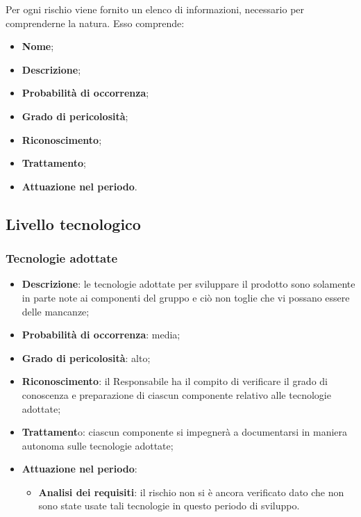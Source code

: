Per ogni rischio viene fornito un elenco di informazioni, necessario per comprenderne la natura. Esso comprende:
\begin{itemize}
	\item \textbf{Nome};
	\item \textbf{Descrizione};
	\item \textbf{Probabilità di occorrenza};
	\item \textbf{Grado di pericolosità};
	\item \textbf{Riconoscimento};
	\item \textbf{Trattamento};
	\item \textbf{Attuazione nel periodo}.
\end{itemize}
	\subsection{Livello tecnologico}
		\subsubsection{Tecnologie adottate}
		\begin{itemize}
			\item \textbf{Descrizione}: le tecnologie adottate per sviluppare il prodotto sono solamente in parte note ai componenti del gruppo e ciò non toglie che vi possano essere delle mancanze;
			\item \textbf{Probabilità di occorrenza}: media;
			\item \textbf{Grado di pericolosità}: alto;
			\item \textbf{Riconoscimento}: il Responsabile ha il compito di verificare il grado di conoscenza e preparazione di ciascun componente relativo alle tecnologie adottate;
			\item \textbf{Trattament}o: ciascun componente si impegnerà a documentarsi in maniera autonoma sulle tecnologie adottate;
			\item \textbf{Attuazione nel periodo}:
			\begin{itemize}
				\item \textbf{Analisi dei requisiti}: il rischio non si è ancora verificato dato che non sono state usate tali tecnologie in questo periodo di sviluppo.
			\end{itemize}
		\end{itemize}
